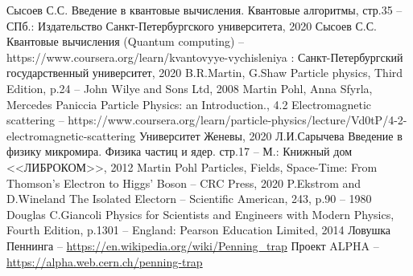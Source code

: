 \documentclass[11pt]{article}
\begin{document}
\begin{thebibliography}{3}
Сысоев С.С. Введение в квантовые вычисления. Квантовые алгоритмы, стр.35 -- СПб.: Издательство Санкт-Петербургского университета, 2020
Сысоев С.С. Квантовые вычисления (Quantum computing) -- https://www.coursera.org/learn/kvantovyye-vychisleniya : Санкт-Петербургский государственный университет, 2020
B.R.Martin, G.Shaw Particle physics, Third Edition, p.24 -- John Wilye and Sons Ltd, 2008
Martin Pohl, Anna Sfyrla, Mercedes Paniccia Particle Physics: an Introduction., 4.2 Electromagnetic scattering -- https://www.coursera.org/learn/particle-physics/lecture/Vd0tP/4-2-electromagnetic-scattering Университет Женевы, 2020
Л.И.Сарычева Введение в физику микромира. Физика частиц и ядер. стр.17 -- М.: Книжный дом <<ЛИБРОКОМ>>, 2012 
Martin Pohl Particles, Fields, Space-Time: From Thomson's Electron to Higgs' Boson -- CRC Press, 2020
P.Ekstrom and D.Wineland The Isolated Electorn -- Scientific American, 243, p.90 -- 1980
Douglas C.Giancoli Physics for Scientists and Engineers with Modern Physics, Fourth Edition, p.1301 -- England: Pearson Education Limited, 2014 
Ловушка Пеннинга -- \url{https://en.wikipedia.org/wiki/Penning_trap}
Проект ALPHA -- \url{https://alpha.web.cern.ch/penning-trap }
\end{thebibliography}
\end{document}
